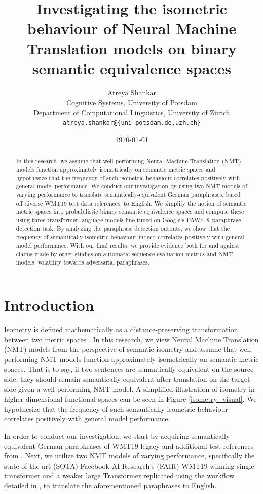 \documentclass[11pt,a4paper]{article}
\title{Investigating the isometric behaviour of Neural Machine Translation models on binary semantic equivalence spaces}
\author{Atreya Shankar \\
  Cognitive Systems, University of Potsdam \\
  Department of Computational Linguistics, University of Zürich \\
  \texttt{atreya.shankar@\{uni-potsdam.de,uzh.ch\}}}
\date{\today}
\begin{document}
\maketitle

\begin{abstract}
  In this research, we assume that well-performing Neural Machine Translation
  (NMT) models function approximately isometrically on semantic metric spaces
  and hypothesize that the frequency of such isometric behaviour correlates
  positively with general model performance. We conduct our investigation by
  using two NMT models of varying performance to translate
  semantically-equivalent German paraphrases, based off diverse WMT19 test data
  references, to English. We simplify the notion of semantic metric spaces into
  probabilistic binary semantic equivalence spaces and compute these using three
  transformer language models fine-tuned on Google's PAWS-X paraphrase detection
  task. By analyzing the paraphrase detection outputs, we show that the
  frequency of semantically isometric behaviour indeed correlates positively
  with general model performance. With our final results, we provide evidence
  both for and against claims made by other studies on automatic sequence
  evaluation metrics and NMT models' volatility towards adversarial paraphrases.
\end{abstract}

\section{Introduction}

Isometry is defined mathematically as a distance-preserving transformation
between two metric spaces \cite{coxeter1961introduction}. In this research, we
view Neural Machine Translation (NMT) models from the perspective of semantic
isometry and assume that well-performing NMT models function approximately
isometrically on semantic metric spaces. That is to say, if two sentences are
semantically equivalent on the source side, they should remain semantically
equivalent after translation on the target side given a well-performing NMT
model. A simplified illustration of isometry in higher dimensional functional
spaces can be seen in Figure \ref{isometry_visual}. We hypothesize that the
frequency of such semantically isometric behaviour correlates positively with
general model performance.

In order to conduct our investigation, we start by acquiring semantically
equivalent German paraphrases of WMT19 legacy and additional test references
from \citet{freitag-bleu-paraphrase-references-2020}. Next, we utilize two NMT
models of varying performance, specifically the state-of-the-art (SOTA) Facebook
AI Research's (FAIR) WMT19 winning single transformer \cite{ng2019facebook} and
a weaker large Transformer replicated using the workflow detailed in
\citet{ott2018scaling}, to translate the aforementioned paraphrases to English.
\end{document}

